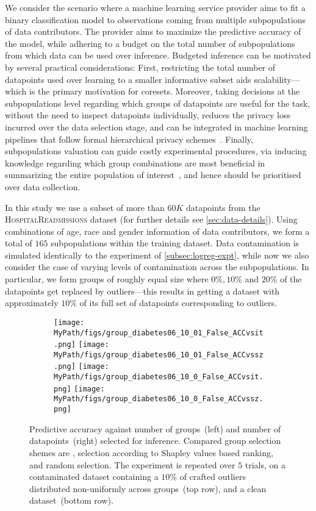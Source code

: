 We consider the scenario where a machine learning service provider aims to fit a binary classification model to observations coming from multiple subpopulations of data contributors. The provider aims to maximize the predictive accuracy of the model, while adhering to a budget on the total number of subpopulations from which data can be used over inference. Budgeted inference can be motivated by several practical considerations: First, restricting the total number of datapoints used over learning to a smaller informative subset aids scalability---which is the primary motivation for coresets. Moreover, taking decisions at the subpopulations level regarding which groups of datapoints are useful for the task, without the need to inspect datapoints individually, reduces the privacy loss incurred over the data selection stage, and can be integrated in machine learning pipelines that follow formal hierarchical privacy schemes~\citep{balle19}. Finally, subpopulations valuation can guide costly experimental procedures, via inducing knowledge regarding which group combinations are most beneficial in summarizing the entire population of interest~\citep{pinsler19, vahidian20}, and hence should be prioritised over data collection.

In this study we use a subset of more than $60K$ datapoints from the \textsc{HospitalReadmissions} dataset (for further details see \cref{sec:data-details}). Using combinations of age, race and gender information of data contributors, we form a total of $165$ subpopulations within the training dataset. Data contamination is simulated identically to the experiment of \cref{subsec:logreg-expt}, while now we also consider the case of varying levels of contamination across the subpopulations. In particular, we form groups of roughly equal size where $0\%, 10\%$ and $20\%$ of the datapoints get replaced by outliers---this results in getting a dataset with approximately $10\%$ of its full set of datapoints corresponding to outliers.


\begin{figure*}[!t]
	\begin{subfigure}[b]{0.9\textwidth} 
		\centering
		\texttt{[image: \\MyPath/figs/group\_diabetes06\_10\_01\_False\_ACCvsit.png]}
		\hfill
		\texttt{[image: \\MyPath/figs/group\_diabetes06\_10\_01\_False\_ACCvssz.png]}
		\centering
		\hfill
		\texttt{[image: \\MyPath/figs/group\_diabetes06\_10\_0\_False\_ACCvsit.png]}
		\centering
		\hfill
		\texttt{[image: \\MyPath/figs/group\_diabetes06\_10\_0\_False\_ACCvssz.png]}
	\end{subfigure}	
	\centering
	\caption{Predictive accuracy against number of groups~(left) and number of datapoints~(right) selected for inference. Compared group selection shemes are \bcores{}, selection according to Shapley values based ranking, and random selection. The experiment is repeated over $5$ trials, on a contaminated dataset containing a $10\%$ of crafted outliers distributed non-uniformly across groups~(top row), and a clean dataset~(bottom row).}
	\label{fig:group_plot}
\end{figure*}


